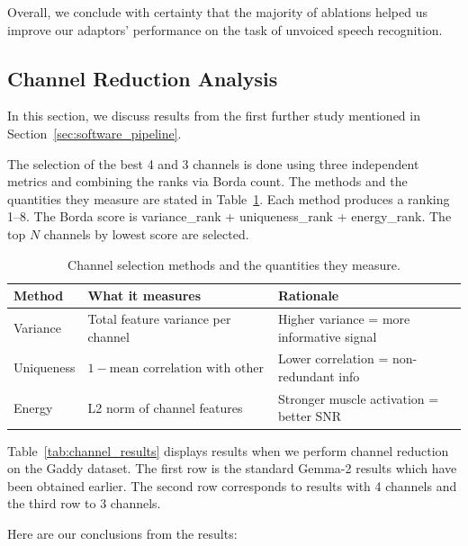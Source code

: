 Overall, we conclude with certainty that the majority of ablations helped us improve our adaptors' performance on the task of unvoiced speech recognition.

\subsection{Channel Reduction Analysis}

In this section, we discuss results from the first further study mentioned in Section~\ref{sec:software_pipeline}.

The selection of the best 4 and 3 channels is done using three independent metrics and combining the ranks via Borda count. The methods and the quantities they measure are stated in Table~\ref{tab:channel_methods}. Each method produces a ranking 1--8. The Borda score is variance\_rank + uniqueness\_rank + energy\_rank. The top $N$ channels by lowest score are selected.

\begin{table}[ht]
\centering
\caption{Channel selection methods and the quantities they measure.}
\label{tab:channel_methods}
\begin{tabular}{lp{5.5cm}p{5.5cm}}
\toprule
\textbf{Method} & \textbf{What it measures} & \textbf{Rationale} \\
\midrule
Variance & Total feature variance per channel & Higher variance = more informative signal \\[4pt]
Uniqueness & $1 - \text{mean correlation with other channels}$ & Lower correlation = non-redundant info \\[4pt]
Energy & L2 norm of channel features & Stronger muscle activation = better SNR \\
\bottomrule
\end{tabular}
\end{table}

Table~\ref{tab:channel_results} displays results when we perform channel reduction on the Gaddy dataset. The first row is the standard Gemma-2 results which have been obtained earlier. The second row corresponds to results with 4 channels and the third row to 3 channels.

Here are our conclusions from the results:

